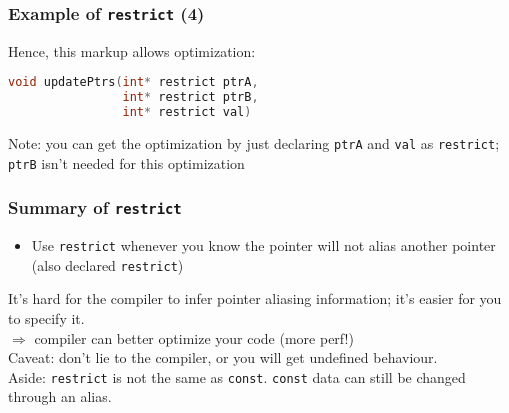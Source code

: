 \begin{frame}[fragile]
  \frametitle{Example of {\tt restrict} (4)}
  
  Hence, this markup allows optimization:
  \begin{lstlisting}[language=C]
void updatePtrs(int* restrict ptrA, 
                int* restrict ptrB,
                int* restrict val)
  \end{lstlisting}
  Note: you can get the optimization by just declaring {\tt ptrA} and
      {\tt val} as {\tt restrict}; {\tt ptrB} isn't needed for this optimization
  
\end{frame}

\begin{frame}[fragile]
  \frametitle{Summary of {\tt restrict}}

  
  \begin{itemize}
    \item Use {\tt restrict} whenever you know the pointer will not alias
      another pointer (also declared {\tt restrict})
  \end{itemize}

    It's hard for the compiler to infer pointer aliasing information;
    it's easier for you to specify it.\\[1em]

    $\Rightarrow$ compiler can better optimize your code (more perf!)\\[1em]

    Caveat: don't lie to the compiler, or  you will get
      \alert{undefined behaviour}.\\[1em]

    Aside: {\tt restrict} is not the same as {\tt const}. {\tt const} data can still be
      changed through an alias.
  
\end{frame}

